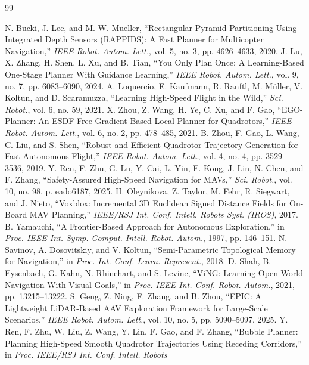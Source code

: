 \documentclass[letterpaper,10pt,conference]{ieeeconf}
\begin{document}
\begingroup
\scriptsize
\begin{thebibliography}{99}

N. Bucki, J. Lee, and M. W. Mueller,
``Rectangular Pyramid Partitioning Using Integrated Depth Sensors (RAPPIDS):
A Fast Planner for Multicopter Navigation,'' \emph{IEEE Robot. Autom. Lett.},
vol. 5, no. 3, pp. 4626--4633, 2020.
J. Lu, X. Zhang, H. Shen, L. Xu, and B. Tian,
``You Only Plan Once: A Learning-Based One-Stage Planner With Guidance
Learning,'' \emph{IEEE Robot. Autom. Lett.}, vol. 9, no. 7,
pp. 6083--6090, 2024.
A. Loquercio, E. Kaufmann, R. Ranftl, M. M\"uller, V. Koltun, and
D. Scaramuzza,
``Learning High-Speed Flight in the Wild,''
\emph{Sci. Robot.}, vol. 6, no. 59, 2021.
X. Zhou, Z. Wang, H. Ye, C. Xu, and F. Gao,
``EGO-Planner: An ESDF-Free Gradient-Based Local Planner for Quadrotors,''
\emph{IEEE Robot. Autom. Lett.}, vol. 6, no. 2, pp. 478--485, 2021.
B. Zhou, F. Gao, L. Wang, C. Liu, and S. Shen,
``Robust and Efficient Quadrotor Trajectory Generation for Fast
Autonomous Flight,'' \emph{IEEE Robot. Autom. Lett.}, vol. 4, no. 4,
pp. 3529--3536, 2019.
Y. Ren, F. Zhu, G. Lu, Y. Cai, L. Yin, F. Kong, J. Lin, N. Chen, and
F. Zhang,
``Safety-Assured High-Speed Navigation for MAVs,''
\emph{Sci. Robot.}, vol. 10, no. 98, p. eado6187, 2025.
H. Oleynikova, Z. Taylor, M. Fehr, R. Siegwart, and J. Nieto,
``Voxblox: Incremental 3D Euclidean Signed Distance Fields for On-Board MAV
Planning,'' \emph{IEEE/RSJ Int. Conf. Intell. Robots Syst. (IROS)}, 2017.
B. Yamauchi,
``A Frontier-Based Approach for Autonomous Exploration,'' in \emph{Proc.
IEEE Int. Symp. Comput. Intell. Robot. Autom.}, 1997, pp. 146--151.
N. Savinov, A. Dosovitskiy, and V. Koltun,
``Semi-Parametric Topological Memory for Navigation,'' in \emph{Proc. Int.
Conf. Learn. Represent.}, 2018.
D. Shah, B. Eysenbach, G. Kahn, N. Rhinehart, and S. Levine,
``ViNG: Learning Open-World Navigation With Visual Goals,'' in \emph{Proc.
IEEE Int. Conf. Robot. Autom.}, 2021, pp. 13215--13222.
S. Geng, Z. Ning, F. Zhang, and B. Zhou,
``EPIC: A Lightweight LiDAR-Based AAV Exploration Framework for Large-Scale
Scenarios,'' \emph{IEEE Robot. Autom. Lett.}, vol. 10, no. 5,
pp. 5090--5097, 2025.
Y. Ren, F. Zhu, W. Liu, Z. Wang, Y. Lin, F. Gao, and F. Zhang,
``Bubble Planner: Planning High-Speed Smooth Quadrotor Trajectories Using
Receding Corridors,'' in \emph{Proc. IEEE/RSJ Int. Conf. Intell. Robots
}
\end{thebibliography}
\end{document}
